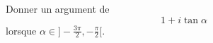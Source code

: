 Donner un argument de 
\[1+i\tan \alpha\]
lorsque $\alpha \in ]-\frac{3\pi}{2}, -\frac{\pi}{2}[$.\bigskip